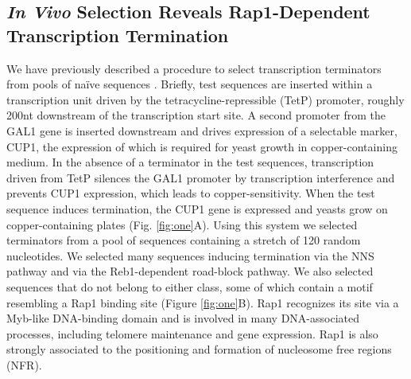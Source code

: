 \singlespacing
\subsection*{\textit{In Vivo} Selection Reveals Rap1-Dependent Transcription Termination}
\doublespacing

We have previously described a procedure to select transcription terminators from pools of naïve sequences \cite{porrua:2012:in}. Briefly, test sequences are inserted within a transcription unit driven by the tetracycline-repressible (TetP) promoter, roughly 200nt downstream of the transcription start site. A second promoter from the GAL1 gene is inserted downstream and drives expression of a selectable marker, CUP1, the expression of which is required for yeast growth in copper-containing medium. In the absence of a terminator in the test sequences, transcription driven from TetP silences the GAL1 promoter by transcription interference and prevents CUP1 expression, which leads to copper-sensitivity. When the test sequence induces termination, the CUP1 gene is expressed and yeasts grow on copper-containing plates (Fig. \ref{fig:one}A). 
Using this system we selected terminators from a pool of sequences containing a stretch of 120 random nucleotides. We selected many sequences inducing termination via the NNS pathway and via the Reb1-dependent road-block pathway. We also selected sequences that do not belong to either class, some of which contain a motif resembling a Rap1 binding site (Figure \ref{fig:one}B). Rap1 recognizes its site via a Myb-like DNA-binding domain and is involved in many DNA-associated processes, including telomere maintenance and gene expression. Rap1 is also strongly associated to the positioning and formation of nucleosome free regions (NFR). 

